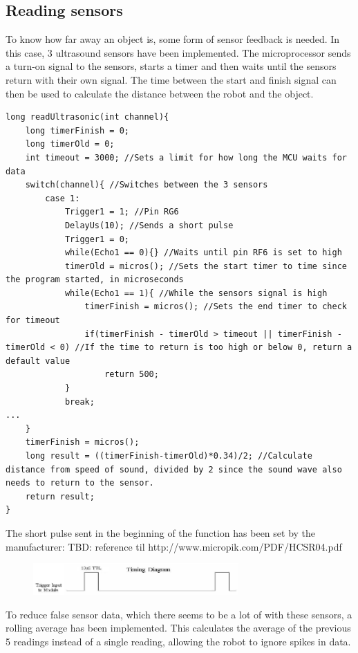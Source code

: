 \subsection{Reading sensors}
To know how far away an object is, some form of sensor feedback is needed. In this case, 3 ultrasound sensors have been implemented. The microprocessor sends a turn-on signal to the sensors, starts a timer and then waits until the sensors return with their own signal. The time between the start and finish signal can then be used to calculate the distance between the robot and the object.\\
\begin{lstlisting}
long readUltrasonic(int channel){  
    long timerFinish = 0;
    long timerOld = 0;
    int timeout = 3000; //Sets a limit for how long the MCU waits for data
    switch(channel){ //Switches between the 3 sensors
        case 1:
            Trigger1 = 1; //Pin RG6
            DelayUs(10); //Sends a short pulse
            Trigger1 = 0;
            while(Echo1 == 0){} //Waits until pin RF6 is set to high
            timerOld = micros(); //Sets the start timer to time since the program started, in microseconds
            while(Echo1 == 1){ //While the sensors signal is high
                timerFinish = micros(); //Sets the end timer to check for timeout
                if(timerFinish - timerOld > timeout || timerFinish - timerOld < 0) //If the time to return is too high or below 0, return a default value
                    return 500;
            }
            break;
...
    }
    timerFinish = micros();
    long result = ((timerFinish-timerOld)*0.34)/2; //Calculate distance from speed of sound, divided by 2 since the sound wave also needs to return to the sensor.
    return result;  
}
\end{lstlisting}
The short pulse sent in the beginning of the function has been set by the manufacturer: TBD: reference til http://www.micropik.com/PDF/HCSR04.pdf
\begin{figure}[!ht]
	\centering
	\includegraphics[width=0.7\textwidth]{figures/sensorTiming.PNG}
	\caption{}
	\label{Timing diagram}
\end{figure}

To reduce false sensor data, which there seems to be a lot of with these sensors, a rolling average has been implemented. This calculates the average of the previous 5 readings instead of a single reading, allowing the robot to ignore spikes in data.
\newpage
